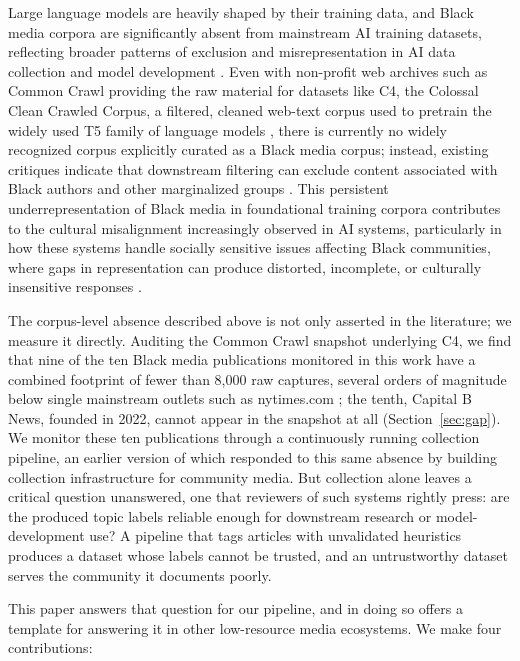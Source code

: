 \documentclass[letterpaper]{article}
\begin{document}
Large language models are heavily shaped by their training data, and Black
media corpora are significantly absent from mainstream AI training
datasets, reflecting broader patterns of exclusion and misrepresentation in
AI data collection and model development \citep{bender2021}. Even with
non-profit web archives such as Common Crawl \citep{baack2024} providing
the raw material for datasets like C4, the Colossal Clean Crawled Corpus,
a filtered, cleaned web-text corpus used to pretrain the widely used T5
family of language models \citep{raffel2020}, there is currently no
widely recognized corpus explicitly curated as a Black media corpus;
instead, existing critiques indicate that downstream filtering can
exclude content associated with Black authors and other marginalized
groups \citep{baack2024}. This persistent
underrepresentation of Black media in foundational training corpora
contributes to the cultural misalignment increasingly observed in AI
systems, particularly in how these systems handle socially sensitive
issues affecting Black communities, where gaps in representation can
produce distorted, incomplete, or culturally insensitive responses
\citep{tao2024}.

The corpus-level absence described above is not only asserted in the
literature; we measure it directly. Auditing the Common Crawl snapshot
underlying C4, we find that nine of the ten Black media publications
monitored in this work have a combined footprint of fewer than 8,000 raw
captures, several orders of magnitude below single mainstream outlets such
as nytimes.com \citep{dodge2021}; the tenth, Capital B News, founded in
2022, cannot appear in the snapshot at all (Section~\ref{sec:gap}). We
monitor these ten publications through a continuously running collection
pipeline, an earlier version of which responded to this same absence by
building collection infrastructure for community media. But collection
alone leaves a critical question unanswered, one that reviewers of such
systems rightly press: are the produced topic labels reliable enough for
downstream research or model-development use? A pipeline that tags
articles with unvalidated heuristics produces a dataset whose labels
cannot be trusted, and an untrustworthy dataset serves the community it
documents poorly.

This paper answers that question for our pipeline, and in doing so offers
a template for answering it in other low-resource media ecosystems. We
make four contributions:
\end{document}
